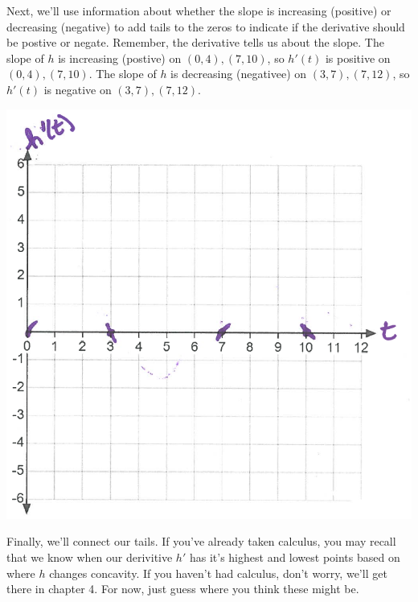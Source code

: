 \documentclass[nooutcomes]{ximera}
\begin{document}
\begin{problem}
\begin{enumerate}
\begin{freeResponse}
\begin{image}
			\end{image}
			Next, we'll use information about whether the slope is increasing (positive) or decreasing (negative) to add tails to the zeros to indicate if the derivative should be postive or negate.  Remember, the derivative tells us about the slope. The slope of $h$ is increasing (postive) on $(0,4),(7,10)$, so $h'(t)$ is positive on $(0,4),(7,10)$.  The slope of $h$ is decreasing (negativee) on $(3,7),(7,12)$, so $h'(t)$ is negative on $(3,7),(7,12)$.
			\begin{image}
			\includegraphics[scale=.4]{Figure11.png}
			\end{image}
			Finally, we'll connect our tails.  If you've already taken calculus, you may recall that we know when our derivitive $h'$ has it's highest and lowest points based on where $h$ changes concavity.  If you haven't had calculus, don't worry, we'll get there in chapter 4.  For now, just guess where you think these might be.
			\begin{image}

\end{image}
\end{freeResponse}
\end{enumerate}
\end{problem}
\end{document}
